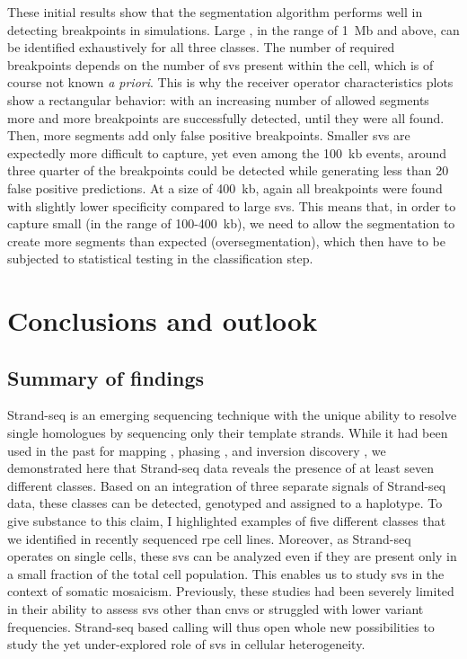 These initial results show that the segmentation algorithm performs well in
detecting \sv breakpoints in simulations. Large \sv, in the range of 1~Mb and
above, can be identified exhaustively for all three \sv classes. The number of
required breakpoints depends on the number of \acp{sv} present within the cell,
which is of course not known \emph{a priori}. This is why the receiver operator
characteristics plots show a rectangular behavior: with an increasing number of
allowed segments more and more \sv breakpoints are successfully detected, until
they were all found. Then, more segments add only false positive breakpoints.
Smaller \acp{sv} are expectedly more difficult to capture, yet even among the
100~kb events, around three quarter of the breakpoints could be detected while
generating less than 20 false positive predictions. At a size of 400~kb, again all
breakpoints were found with slightly lower specificity compared to large
\acp{sv}. This means that, in order to capture small \sv (in the range of
100-400~kb), we need to allow the segmentation to create more segments than
expected (oversegmentation), which then have to be subjected to statistical
testing in the classification step.





\section{Conclusions and outlook}
\label{sec:mosaic_conclusion}


\subsection{Summary of findings}

Strand-seq is an emerging sequencing technique with the unique ability to
resolve single homologues by sequencing only their template strands. While it
had been used in the past for \sce mapping \citep{Falconer2012}, phasing
\citep{Porubsky2016}, and inversion discovery \citep{Sanders2017}, we
demonstrated here that Strand-seq data reveals the presence of at least seven
different \sv classes. Based on an integration of three separate signals of
Strand-seq data, these \sv classes can be detected, genotyped and assigned to a
haplotype. To give substance to this claim, I highlighted examples of five
different \sv classes that we identified in recently sequenced \acf{rpe} cell lines.
Moreover, as Strand-seq operates on single cells, these \acp{sv} can be analyzed
even if they are present only in a small fraction of the total cell population.
This enables us to study \acp{sv} in the context of somatic mosaicism.
Previously, these studies had been severely limited in their ability to assess
\acp{sv} other than \acp{cnv} or struggled with lower variant frequencies.
Strand-seq based \sv calling will thus open whole new possibilities to study
the yet under-explored role of \acp{sv} in cellular heterogeneity.

